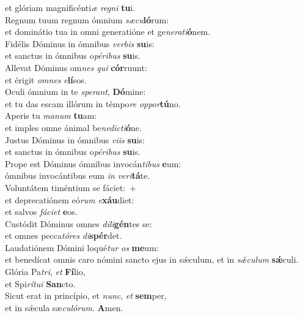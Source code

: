 \evenverse et glóriam magnificénti\textit{æ} \textit{re}\textit{gni} \textbf{tu}i.\\
\oddverse Regnum tuum regnum ómnium \textit{sæ}\textit{cu}\textbf{ló}rum:~\*\\
\oddverse et dominátio tua in omni generatióne et ge\textit{ne}\textit{ra}\textit{ti}\textbf{ó}nem.\\
\evenverse Fidélis Dóminus in ómnibus \textit{ver}\textit{bis} \textbf{su}is:~\*\\
\evenverse et sanctus in ómnibus o\textit{pé}\textit{ri}\textit{bus} \textbf{su}is.\\
\oddverse Allevat Dóminus om\textit{nes} \textit{qui} \textbf{cór}ruunt:~\*\\
\oddverse et érigit \textit{om}\textit{nes} \textit{e}\textbf{lí}sos.\\
\evenverse Oculi ómnium in te \textit{spe}\textit{rant}, \textbf{Dó}mine:~\*\\
\evenverse et tu das escam illórum in témpo\textit{re} \textit{op}\textit{por}\textbf{tú}no.\\
\oddverse Aperis tu \textit{ma}\textit{num} \textbf{tu}am:~\*\\
\oddverse et imples omne ánimal be\textit{ne}\textit{di}\textit{cti}\textbf{ó}ne.\\
\evenverse Justus Dóminus in ómnibus \textit{vi}\textit{is} \textbf{su}is:~\*\\
\evenverse et sanctus in ómnibus o\textit{pé}\textit{ri}\textit{bus} \textbf{su}is.\\
\oddverse Prope est Dóminus ómnibus invocán\textit{ti}\textit{bus} \textbf{e}um:~\*\\
\oddverse ómnibus invocántibus eum \textit{in} \textit{ve}\textit{ri}\textbf{tá}te.\\
\evenverse Voluntátem timéntium se fáciet:~+\\
\evenverse  et deprecatiónem eó\textit{rum} \textit{e}\textbf{xáu}diet:~\*\\
\evenverse et salvos \textit{fá}\textit{ci}\textit{et} \textbf{e}os.\\
\oddverse Custódit Dóminus omnes \textit{di}\textit{li}\textbf{gén}tes se:~\*\\
\oddverse et omnes pecca\textit{tó}\textit{res} \textit{di}\textbf{spér}det.\\
\evenverse Laudatiónem Dómini loqué\textit{tur} \textit{os} \textbf{me}um:~\*\\
\evenverse et benedícat omnis caro nómini sancto ejus in sǽculum, et in \textit{sǽ}\textit{cu}\textit{lum} \textbf{sǽ}culi.\\
\oddverse Glória Pa\textit{tri}, \textit{et} \textbf{Fí}lio,~\*\\
\oddverse et Spi\textit{rí}\textit{tu}\textit{i} \textbf{San}cto.\\
\evenverse Sicut erat in princípio, et \textit{nunc}, \textit{et} \textbf{sem}per,~\*\\
\evenverse et in sǽcula sæ\textit{cu}\textit{ló}\textit{rum}. \textbf{A}men.\\
